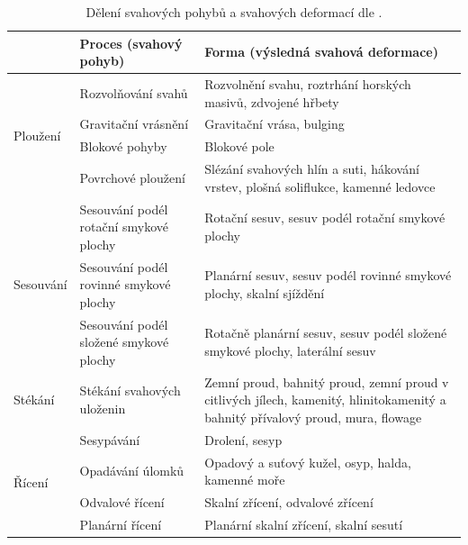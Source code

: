 \begin{table}[t]
	\begin{tabularx}{\textwidth}{lp{4.5cm}X}
		\toprule
		& Proces (svahový pohyb)                 & Forma (výsledná svahová deformace)                                                 \\ \midrule
		\multirow{4}{*}{Ploužení}  & Rozvolňování svahů                     & Rozvolnění svahu, roztrhání horských masivů, zdvojené hřbety                       \\
		& Gravitační vrásnění                    & Gravitační vrása, bulging                                                          \\
		& Blokové pohyby                         & Blokové pole                                                                       \\
		& Povrchové ploužení                     & Slézání svahových hlín a suti, hákování vrstev, plošná soliflukce, kamenné ledovce \\ \midrule
		\multirow{3}{*}{Sesouvání} & Sesouvání podél rotační smykové plochy & Rotační sesuv, sesuv podél rotační smykové plochy                                  \\
		& Sesouvání podél rovinné smykové plochy & Planární sesuv, sesuv podél rovinné smykové plochy, skalní sjíždění                \\
		& Sesouvání podél složené smykové plochy & Rotačně planární sesuv, sesuv podél složené smykové plochy, laterální sesuv        \\ \midrule
		Stékání & Stékání svahových uloženin & Zemní proud, bahnitý proud, zemní proud v citlivých jílech, kamenitý, hlinitokamenitý a bahnitý přívalový proud, mura, flowage \\ \midrule
		\multirow{4}{*}{Řícení}    & Sesypávání                             & Drolení, sesyp                                                                     \\
		& Opadávání úlomků                       & Opadový a suťový kužel, osyp, halda, kamenné moře                                  \\
		
		& Odvalové řícení                        & Skalní zřícení, odvalové zřícení                                                   \\
		& Planární řícení                        & Planární skalní zřícení, skalní sesutí \\                                           \bottomrule
	\end{tabularx}
	\caption{Dělení svahových pohybů a svahových deformací dle \textcite{nemcokDeleniSvahovychPohybu1974}.}
	\label{tab:cs_klasifikace}
\end{table}



